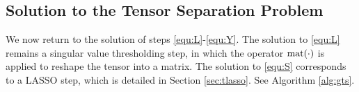 \documentclass[10pt]{article}  	%
\theoremstyle{definition}
\theoremstyle{definition}
\newcommand{\R}{{\mathbb{R}}}
\newcommand{\Bc}{\boldsymbol{{\mathcal{B}}}}
\newcommand{\Xc}{ \boldsymbol{{\mathcal{X}}}}
\newcommand{\Uc}{\boldsymbol{{\mathcal{U}}}}
\newcommand{\Rc}{\boldsymbol{{\mathcal{R}}}}
\newcommand{\Zc}{\boldsymbol{{\mathcal{Z}}}}
\DeclareMathOperator*{\mat}{{\rm{mat}}}
\newcommand{\vd}{\mathbf{d}}
\newcommand{\mE}{\mathbf{E}}
\newcommand{\mF}{\mathbf{F}}
\newcommand{\mG}{\mathbf{G}}
\newcommand{\mI}{\mathbf{I}}
\newcommand{\mJ}{\mathbf{J}}
\newcommand{\mL}{\mathbf{L}}
\theoremstyle{remark}
\begin{document}

\subsection{Solution to the Tensor Separation Problem }
 
We now return to the solution of steps \eqref{equ:L}-\eqref{equ:Y}. The solution to \eqref{equ:L} remains a singular value thresholding step, in which the operator $\mat(\cdot)$ is applied to reshape the tensor into a matrix. The solution to \eqref{equ:S} corresponds to a LASSO step, which is detailed in Section \ref{sec:tlasso}. See Algorithm \ref{alg:gts}.
\end{document}
